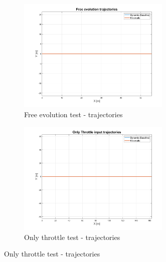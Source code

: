 \begin{figure}[H]
\centering

    \begin{subfigure}{.5\textwidth}
    \centering
   \includegraphics[width=0.8\textwidth,keepaspectratio]{Figures/Free_evo_traj.png}
    \caption{Free evolution test - trajectories}
    \label{subfig:free_evo}
    \end{subfigure}%
    \begin{subfigure}{.5\textwidth}
    \centering
    \includegraphics[width=0.8\textwidth,keepaspectratio]{Figures/Throttle_traj.png}
    \caption{Only throttle test - trajectories}
    \label{subfig:only_throttle}
    \end{subfigure}
    
    \vspace{10mm}
    

\end{figure}
